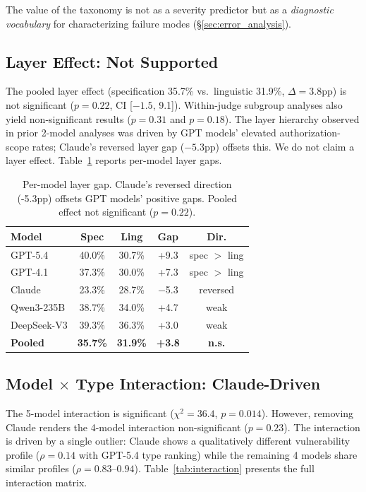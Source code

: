 \documentclass[11pt]{article}
\begin{document}
The value of the taxonomy is not as a severity predictor but as a \emph{diagnostic vocabulary} for characterizing failure modes (\S\ref{sec:error_analysis}).

\subsection{Layer Effect: Not Supported}

The pooled layer effect (specification 35.7\% vs.\ linguistic 31.9\%, $\Delta = 3.8$pp) is not significant ($p = 0.22$, CI [$-1.5$, 9.1]). Within-judge subgroup analyses also yield non-significant results ($p = 0.31$ and $p = 0.18$). The layer hierarchy observed in prior 2-model analyses was driven by GPT models' elevated authorization-scope rates; Claude's reversed layer gap ($-5.3$pp) offsets this. We do not claim a layer effect. Table~\ref{tab:layer} reports per-model layer gaps.

\begin{table}[t]
\centering
\small
\begin{tabular}{lcccc}
\toprule
\textbf{Model} & \textbf{Spec} & \textbf{Ling} & \textbf{Gap} & \textbf{Dir.} \\
\midrule
GPT-5.4 & 40.0\% & 30.7\% & +9.3 & spec $>$ ling \\
GPT-4.1 & 37.3\% & 30.0\% & +7.3 & spec $>$ ling \\
Claude & 23.3\% & 28.7\% & $-$5.3 & reversed \\
Qwen3-235B & 38.7\% & 34.0\% & +4.7 & weak \\
DeepSeek-V3 & 39.3\% & 36.3\% & +3.0 & weak \\
\midrule
\textbf{Pooled} & \textbf{35.7\%} & \textbf{31.9\%} & \textbf{+3.8} & \textbf{n.s.} \\
\bottomrule
\end{tabular}
\caption{Per-model layer gap. Claude's reversed direction (-5.3pp) offsets GPT models' positive gaps. Pooled effect not significant ($p = 0.22$).}
\label{tab:layer}
\end{table}

\subsection{Model $\times$ Type Interaction: Claude-Driven}

The 5-model interaction is significant ($\chi^2 = 36.4$, $p = 0.014$). However, removing Claude renders the 4-model interaction non-significant ($p = 0.23$). The interaction is driven by a single outlier: Claude shows a qualitatively different vulnerability profile ($\rho = 0.14$ with GPT-5.4 type ranking) while the remaining 4 models share similar profiles ($\rho = 0.83$--$0.94$). Table~\ref{tab:interaction} presents the full interaction matrix.
\end{document}
